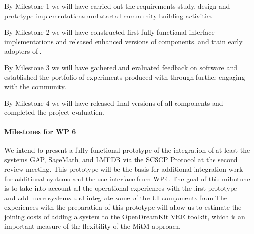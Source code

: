 \begin{milestones}
  {By Milestone 1 we will have carried out the requirements study, design and prototype implementations and started community building activities.}

  {By Milestone 2 we will have constructed first fully functional interface implementations and released enhanced versions of \TheProject components, and train early adopters of \TheProject.}

  {By Milestone 3 we will have gathered and evaluated feedback on \TheProject software and established the portfolio of experiments produced with \TheProject through further engaging with the community.}

  {By Milestone 4 we will have released final versions of all \TheProject components and completed the project evaluation.}
\end{milestones}

\paragraph{Milestones for WP 6}

\begin{milestones}
  {We intend to present a fully functional prototype of the integration of at least the
    systems GAP, SageMath, and LMFDB via the SCSCP Protocol at the second review 
    meeting. This prototype will be the basis for additional integration work for 
    additional systems and the use interface from WP4.}
  {The goal of this milestone is to take into account all the operational 
    experiences with the first prototype and add more systems and integrate some
    of the UI components from The experiences with the preparation of 
    this prototype will allow us to estimate the joining costs of adding a system 
    to the OpenDreamKit VRE toolkit, which is an important measure of the 
    flexibility of the MitM approach.}
\end{milestones}


